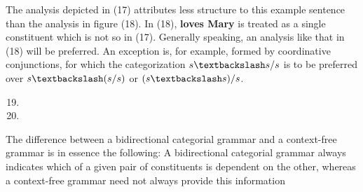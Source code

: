 \documentclass[11pt]{article}
\begin{document}
The analysis depicted in (17) attributes less structure to this example
sentence than the analysis in figure (18). In (18), \textbf{loves Mary} is treated as
a single constituent which is not so in (17). Generally speaking, an
analysis like that in (18) will be preferred. An exception is, for example,
formed by coordinative conjunctions, for which the categorization
\(s\textbackslash s/s\) is to be preferred over \(s\textbackslash(s/s)\) or
\((s\textbackslash s)/s\).
\begin{enumerate}
\setcounter{enumi}{18}
\item {}
\item {}
\end{enumerate}


The difference between a bidirectional categorial grammar and a context-free
grammar is in essence the following: A bidirectional categorial grammar
always indicates which of a given pair of constituents is dependent on the
other, whereas a context-free grammar need not always provide this information
\end{document}
